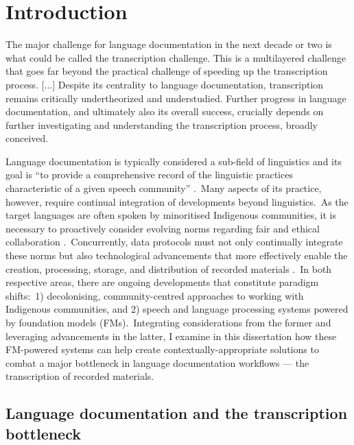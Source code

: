 \documentclass[main.tex]{subfiles}
\begin{document}
\chapter{Introduction}

\setlength{\epigraphwidth}{0.75\textwidth}
\renewcommand{\textflush}{flushepinormal}
\epigraph{The major challenge for language documentation in the next decade or two is what could be called the transcription challenge. This is a multilayered challenge that goes far beyond the practical challenge of speeding up the transcription process. [...] Despite its centrality to language documentation, transcription remains critically undertheorized and understudied. Further progress in language documentation, and ultimately also its overall success, crucially depends on further investigating and understanding the transcription process, broadly conceived.}%
         {\justifying{}}

Language documentation is typically considered a sub-field of linguistics and its goal is ``to provide a comprehensive record of the linguistic practices characteristic of a given speech community'' \parencite[][p.~166]{himmelmann1998documentary}.~Many aspects of its practice, however, require continual integration of developments beyond linguistics.~As the target languages are often spoken by minoritised Indigenous communities, it is necessary to proactively consider evolving norms regarding fair and ethical collaboration \parencite{holton2022indigenous}.~Concurrently, data protocols must not only continually integrate these norms but also technological advancements that more effectively enable the creation, processing, storage, and distribution of recorded materials \parencite{berez2023recent}.~In both respective areas, there are ongoing developments that constitute paradigm shifts:~1) decolonising, community-centred approaches to working with Indigenous communities, and 2) speech and language processing systems powered by foundation models (FMs).~Integrating considerations from the former and leveraging advancements in the latter, I examine in this dissertation how these FM-powered systems can help create contextually-appropriate solutions to combat a major bottleneck in language documentation workflows --- the transcription of recorded materials.

\section{Language documentation and the transcription bottleneck}
\end{document}
